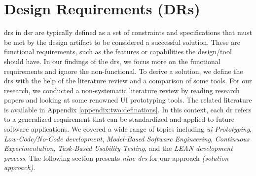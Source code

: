 \section{Design Requirements (DRs)}
\label{design:section:designReqs}
\ac{dr}s in \ac{dsr} are typically defined as a set of constraints and specifications that must be met by the design artifact to be considered a successful solution. 
These are functional requirements, such as the features or capabilities the design/tool should have.
In our findings of the \ac{dr}s, we focus more on the functional requirements and ignore the non-functional.
To derive a solution, we define the \ac{dr}s with the help of the literature review and a comparison of some tools.
For our research, we conducted a non-systematic literature review by reading research papers and looking at some renowned UI prototyping tools. 
The related literature is available in Appendix \ref{appendix:two:definations}.
In this context, each \ac{dr} refers to a generalized requirement that can be standardized and applied to future software applications.
We covered a wide range of topics including \textit{\ac{ui} Prototyping}, \textit{Low-Code/No-Code development}, \textit{Model-Based Software Engineering}, \textit{Continuous Experimentation}, \textit{Task-Based Usability Testing}, and the \textit{LEAN development process}.
The following section presents \textit{nine \ac{dr}s} for our approach \textit{(solution approach)}.
